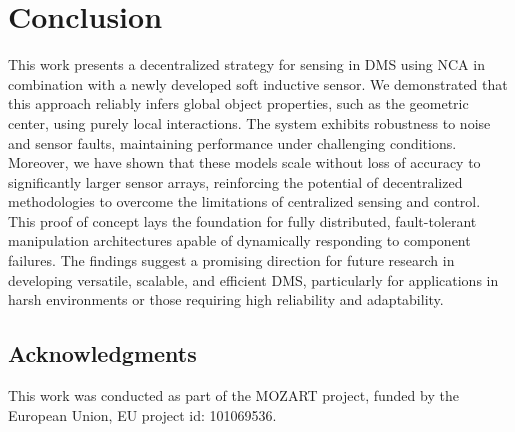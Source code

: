 \section{Conclusion}

This work presents a decentralized strategy for sensing in \acf{DMS} using \acf{NCA} in combination with a newly developed soft inductive sensor. We demonstrated that this approach reliably infers global object properties, such as the geometric center, using purely local interactions. The system exhibits robustness to noise and sensor faults, maintaining performance under challenging conditions. 
Moreover, we have shown that these models scale without loss of accuracy to significantly larger sensor arrays, reinforcing the potential of decentralized methodologies to overcome the limitations of centralized sensing and control. This proof of concept lays the foundation for fully distributed, fault-tolerant manipulation architectures apable of dynamically responding to component failures.
The findings suggest a promising direction for future research in developing versatile, scalable, and efficient \ac{DMS}, particularly for applications in harsh environments or those requiring high reliability and adaptability.

\subsection{Acknowledgments}
This work was conducted as part of the MOZART project, funded by the European Union, EU project id: 101069536.


